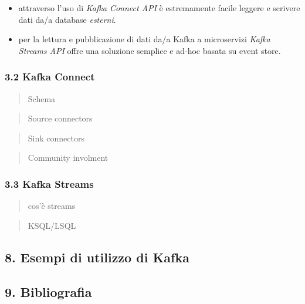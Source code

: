 \documentclass[]{article}
\providecommand{\tightlist}{%
  \setlength{\itemsep}{0pt}\setlength{\parskip}{0pt}}
\begin{document}
\begin{itemize}
\tightlist
\item
  attraverso l'uso di \emph{Kafka Connect API} è estremamente facile
  leggere e scrivere dati da/a database \emph{esterni}.
\item
  per la lettura e pubblicazione di dati da/a Kafka a microservizi
  \emph{Kafka Streams API} offre una soluzione semplice e ad-hoc basata
  su event store.
\end{itemize}

\subsubsection{3.2 Kafka Connect}\label{kafka-connect}

\begin{quote}
Schema
\end{quote}

\begin{quote}
Source connectors
\end{quote}

\begin{quote}
Sink connectors
\end{quote}

\begin{quote}
Community involment
\end{quote}

\subsubsection{3.3 Kafka Streams}\label{kafka-streams}

\begin{quote}
cos'è streams
\end{quote}

\begin{quote}
KSQL/LSQL
\end{quote}

\subsection{8. Esempi di utilizzo di
Kafka}\label{esempi-di-utilizzo-di-kafka}

\newpage

\subsection{9. Bibliografia}\label{bibliografia}
\end{document}
